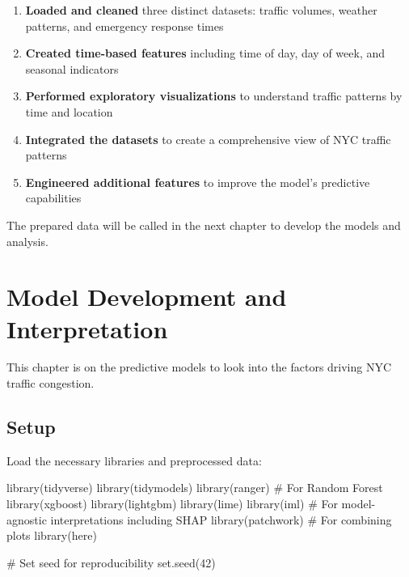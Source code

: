 \documentclass[
  letterpaper,
  DIV=11,
  numbers=noendperiod]{scrreprt}
\newenvironment{Shaded}{\begin{snugshade}}{\end{snugshade}}
\newcommand{\CommentTok}[1]{\textcolor[rgb]{0.37,0.37,0.37}{#1}}
\newcommand{\DecValTok}[1]{\textcolor[rgb]{0.68,0.00,0.00}{#1}}
\newcommand{\FunctionTok}[1]{\textcolor[rgb]{0.28,0.35,0.67}{#1}}
\newcommand{\NormalTok}[1]{\textcolor[rgb]{0.00,0.23,0.31}{#1}}
\providecommand{\tightlist}{%
  \setlength{\itemsep}{0pt}\setlength{\parskip}{0pt}}\usepackage{longtable,booktabs,array}
\begin{document}
\begin{enumerate}
\def\labelenumi{\arabic{enumi}.}
\tightlist
\item
  \textbf{Loaded and cleaned} three distinct datasets: traffic volumes,
  weather patterns, and emergency response times
\item
  \textbf{Created time-based features} including time of day, day of
  week, and seasonal indicators
\item
  \textbf{Performed exploratory visualizations} to understand traffic
  patterns by time and location
\item
  \textbf{Integrated the datasets} to create a comprehensive view of NYC
  traffic patterns
\item
  \textbf{Engineered additional features} to improve the model's
  predictive capabilities
\end{enumerate}

The prepared data will be called in the next chapter to develop the
models and analysis.


\chapter{Model Development and
Interpretation}\label{model-development-and-interpretation}

This chapter is on the predictive models to look into the factors
driving NYC traffic congestion.

\section{Setup}\label{setup}

Load the necessary libraries and preprocessed data:

\begin{Shaded}
\begin{Highlighting}[]
\FunctionTok{library}\NormalTok{(tidyverse)}
\FunctionTok{library}\NormalTok{(tidymodels)}
\FunctionTok{library}\NormalTok{(ranger) }\CommentTok{\# For Random Forest}
\FunctionTok{library}\NormalTok{(xgboost)}
\FunctionTok{library}\NormalTok{(lightgbm)}
\FunctionTok{library}\NormalTok{(lime)}
\FunctionTok{library}\NormalTok{(iml) }\CommentTok{\# For model{-}agnostic interpretations including SHAP}
\FunctionTok{library}\NormalTok{(patchwork) }\CommentTok{\# For combining plots}
\FunctionTok{library}\NormalTok{(here)}

\CommentTok{\# Set seed for reproducibility}
\FunctionTok{set.seed}\NormalTok{(}\DecValTok{42}\NormalTok{)}
\end{Highlighting}
\end{Shaded}
\end{document}
